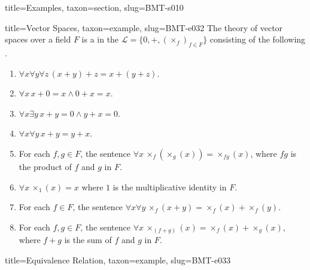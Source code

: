 \documentclass[a4paper]{article}
\begin{document}
\begin{tree}{title={Examples}, taxon={section}, slug={BMT-s010}}
\begin{tree}{title={Vector Spaces}, taxon={example}, slug={BMT-e032}}
    The theory of vector spaces over a field \(F\) is a  in the  \(\mathcal  L= \{ 0,+,( \times _f)_{f \in  F} \}\)
    consisting of the following .
    \begin{enumerate}
\item{\(\forall  x \forall  y \forall  z \, (x+y)+z=x+(y+z)\).
        }
        \item{\(\forall  x \, x+0=x \land0 +x=x\).
        }
        \item{\(\forall  x \exists  y \, x+y=0 \land  y+x=0\).
        }
        \item{\(\forall  x \forall  y \, x+y=y+x\).
        }
        \item{
            For each \(f,g \in  F\), the sentence \(\forall  x \, \times _f( \times _g(x)) =  \times _{fg}(x)\), where \(fg\) is the product of \(f\) and \(g\) in \(F\).
        }
        \item{\(\forall  x \, \times _1(x) = x\) where \(1\) is the multiplicative identity in \(F\).
        }
        \item{
            For each \(f \in  F\), the sentence \(\forall  x \forall  y \, \times _f(x+y) =  \times _f(x)+ \times _f(y)\).
        }
        \item{
            For each \(f,g \in  F\), the sentence \(\forall  x \, \times _(f+g)(x) =  \times _f(x)+ \times _g(x)\), where \(f+g\) is the sum of \(f\) and \(g\) in \(F\).
        }
\end{enumerate}
\end{tree}

\begin{tree}{title={Equivalence Relation}, taxon={example}, slug={BMT-e033}}


\end{tree}
\end{tree}
\end{document}
